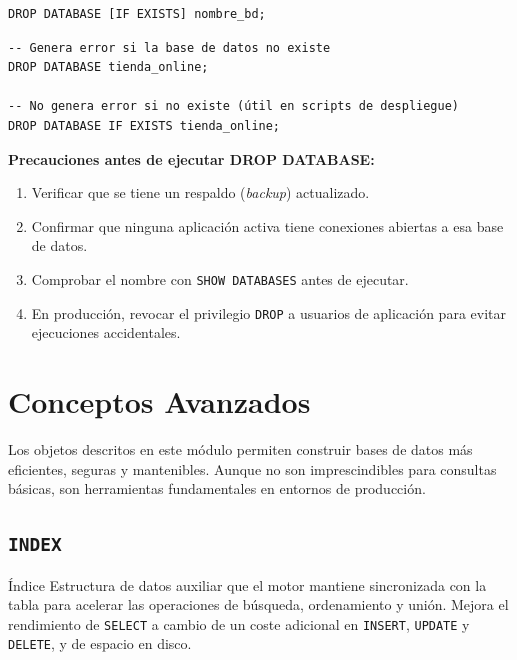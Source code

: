 \begin{lstlisting}[style=sql, caption={Sintaxis de DROP DATABASE}]
DROP DATABASE [IF EXISTS] nombre_bd;
\end{lstlisting}

\begin{ejemplo}
\begin{lstlisting}[style=sql, caption={DROP DATABASE con y sin guarda}]
-- Genera error si la base de datos no existe
DROP DATABASE tienda_online;

-- No genera error si no existe (útil en scripts de despliegue)
DROP DATABASE IF EXISTS tienda_online;
\end{lstlisting}
\end{ejemplo}

\begin{nota}
  \textbf{Precauciones antes de ejecutar DROP DATABASE:}
  \begin{enumerate}
    \item Verificar que se tiene un respaldo (\textit{backup}) actualizado.
    \item Confirmar que ninguna aplicación activa tiene conexiones abiertas
          a esa base de datos.
    \item Comprobar el nombre con \texttt{SHOW DATABASES} antes de ejecutar.
    \item En producción, revocar el privilegio \texttt{DROP} a usuarios de
          aplicación para evitar ejecuciones accidentales.
  \end{enumerate}
\end{nota}

\newpage
\section{Conceptos Avanzados}

Los objetos descritos en este módulo permiten construir bases de datos más
eficientes, seguras y mantenibles. Aunque no son imprescindibles para
consultas básicas, son herramientas fundamentales en entornos de producción.

\subsection{\texttt{INDEX}}

\begin{definicion}{Índice}
  Estructura de datos auxiliar que el motor mantiene sincronizada con la
  tabla para acelerar las operaciones de búsqueda, ordenamiento y unión.
  Mejora el rendimiento de \texttt{SELECT} a cambio de un coste adicional
  en \texttt{INSERT}, \texttt{UPDATE} y \texttt{DELETE}, y de espacio en
  disco.
\end{definicion}

